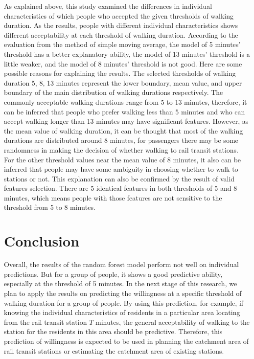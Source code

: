 %
As explained above, this study examined the differences in individual characteristics of which people who accepted the given thresholds of walking duration. As the results, people with different individual characteristics shows different acceptability at each threshold of walking duration. According to the evaluation from the method of simple moving average, the model of 5 minutes’ threshold has a better explanatory ability, the model of 13 minutes' threshold is a little weaker, and the model of 8 minutes' threshold is not good. Here are some possible reasons for explaining the results. The selected thresholds of walking duration 5, 8, 13 minutes represent the lower boundary, mean value, and upper boundary of the main distribution of walking durations respectively. The commonly acceptable walking durations range from 5 to 13 minutes, therefore, it can be inferred that people who prefer walking less than 5 minutes and who can accept walking longer than 13 minutes may have significant features. However, as the mean value of walking duration, it can be thought that most of the walking durations are distributed around 8 minutes, for passengers there may be some randomness in making the decision of whether walking to rail transit stations. For the other threshold values near the mean value of 8 minutes, it also can be inferred that people may have some ambiguity in choosing whether to walk to stations or not. This explanation can also be confirmed by the result of valid features selection. There are 5 identical features in both thresholds of 5 and 8 minutes, which means people with those features are not sensitive to the threshold from 5 to 8 minutes.

\section{Conclusion}
%
Overall, the results of the random forest model perform not well on individual predictions. But for a group of people, it shows a good predictive ability, especially at the threshold of 5 minutes. In the next stage of this research, we plan to apply the results on predicting the willingness at a specific threshold of walking duration for a group of people. By using this prediction, for example, if knowing the individual characteristics of residents in a particular area locating from the rail transit station $T$ minutes, the general acceptability of walking to the station for the residents in this area should be predictive. Therefore, this prediction of willingness is expected to be used in planning the catchment area of rail transit stations or estimating the catchment area of existing stations.

\clearpage %

